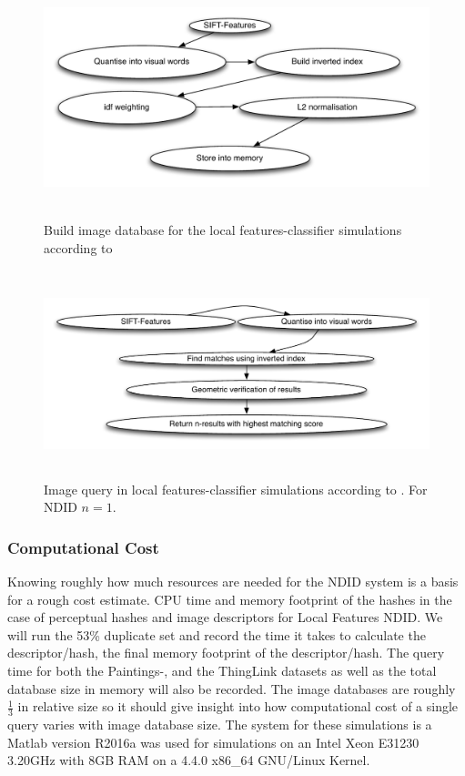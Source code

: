 \documentclass[english,12pt,a4paper,pdftex,elec,utf8, table]{aaltothesis}
\begin{document}
\begin{figure}[htb]
\begin{center}
  \includegraphics[height=7cm]{figures/vedaldigenindex}
\end{center}
\caption{Build image database for the local features-classifier simulations according to \cite{Vedaldi2012}}
\label{vedaldigenindex}
\end{figure}

\begin{figure}[htb]
\begin{center}
\includegraphics[height=6cm]{figures/vedaldiquery}
\end{center}
\caption{Image query in local features-classifier simulations according to \cite{Vedaldi2012}. For NDID $n=1$.}
\label{vedaldiquery}
\end{figure}

\subsubsection{Computational Cost}
Knowing roughly how much resources are needed for the NDID system is a basis for a rough cost estimate. CPU time and memory footprint of the hashes in the case of perceptual hashes and image descriptors for Local Features NDID. We will run the 53\% duplicate set and record the time it takes to calculate the descriptor/hash, the final memory footprint of the descriptor/hash. The query time for both the Paintings-, and the ThingLink datasets as well as the total database size in memory will also be recorded. The image databases are roughly $\frac{1}{3}$ in relative size so it should give insight into how computational cost of a single query varies with image database size. The system for these simulations is a Matlab version R2016a was used for simulations on an Intel Xeon E31230 3.20GHz with 8GB RAM on a 4.4.0 x86\_64 GNU/Linux Kernel.
\end{document}
